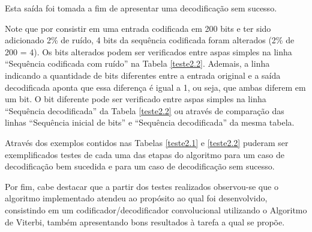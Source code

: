 \documentclass[12pt]{article}
\begin{document}
Esta saída foi tomada a fim de apresentar uma decodificação sem sucesso.

Note que por consistir em uma entrada codificada em 200 bits e ter sido adicionado 2\% de ruído, 4 bits da sequência codificada foram alterados (2\% de 200 = 4). Os bits alterados podem ser verificados entre aspas simples na linha ``Sequência codificada com ruído'' na Tabela \ref{teste2.2}. Ademais, a linha indicando a quantidade de bits diferentes entre a entrada original e a saída decodificada aponta que essa diferença é igual a 1, ou seja, que ambas diferem em um bit. O bit diferente pode ser verificado entre aspas simples na linha ``Sequência decodificada'' da Tabela \ref{teste2.2} ou através de comparação das linhas  ``Sequência inicial de bits'' e ``Sequência decodificada'' da mesma tabela.

Através dos exemplos contidos nas Tabelas \ref{teste2.1} e \ref{teste2.2} puderam ser exemplificados testes de cada uma das etapas do algoritmo para um caso de decodificação bem sucedida e para um caso de decodificação sem sucesso.

Por fim, cabe destacar que a partir dos testes realizados observou-se que o algoritmo implementado atendeu ao propósito ao qual foi desenvolvido, consistindo em um codificador/decodificador convolucional utilizando o Algoritmo de Viterbi, também apresentando bons resultados à tarefa a qual se propõe.



\end{document}
